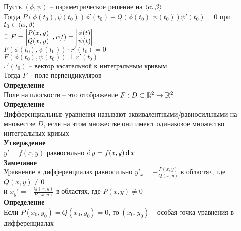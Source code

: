 \documentclass[12pt]{article}
\begin{document}
Пусть $(\phi, \psi)$ -- параметрическое решение на $\langle \alpha, \beta \rangle$\\
Тогда $P(\phi(t_0), \psi(t_0))\phi'(t_0) + Q(\phi(t_0), \psi(t_0))\psi'(t_0) = 0$ при $t_0 \in \langle \alpha, \beta \rangle$\\
$\letus F = \begin{vmatrix}
    P(x,y)\\
    Q(x,y)
\end{vmatrix}, r(t) = \begin{vmatrix}
    \phi(t)\\
    \psi(t)
\end{vmatrix}$\\
$F(\phi(t_0), \psi(t_0))\cdot r'(t_0) = 0$\\
$F(\phi(t_0), \psi(t_0))\perp r'(t_0)$\\
$r'(t_0)$ -- вектор касательной к интегральным кривым\\
Тогда $F$ -- поле перпендикуляров\\
\textbf{Определение}\\
Поле на плоскости -- это отображение $F: D \subset \mathbb{R}^2 \rightarrow \mathbb{R}^2$\\
\textbf{Определение}\\
Дифференциальные уравнения называют эквивалентными/равносильными на множестве $D$, если на этом множестве они имеют одинаковое множество интегральных кривых\\
\textbf{Утверждение}\\
$y'=f(x,y)$ равносильно $\operatorname{d} y = f(x,y)\operatorname{d} x$\\
\textbf{Замечание}\\
Уравнение в дифференциалах равносильно $y'_x = -\frac{P(x,y)}{Q(x,y)}$ в областях, где $Q(x,y) \neq 0$\\
и $x_y' = -\frac{Q(x,y)}{P(x,y)}$ в областях, где $P(x,y)\neq 0$\\
\textbf{Определение}\\
Если $P(x_0, y_0) = Q(x_0, y_0) = 0$, то $(x_0, y_0)$ -- особая точка уравнения в дифференциалах\\
\end{document}
